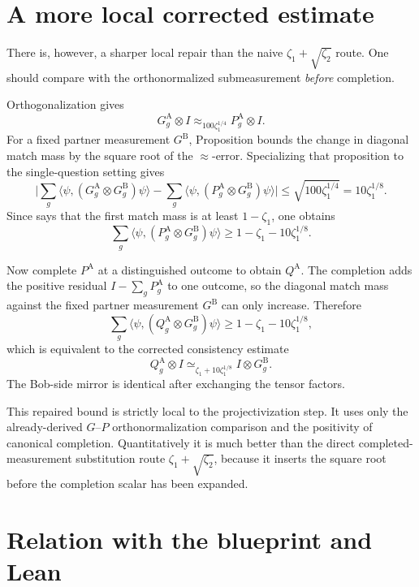 \documentclass[11pt]{article}
\begin{document}
\section{A more local corrected estimate}

There is, however, a sharper local repair than the naive
$\zeta_1 + \sqrt{\zeta_2}$ route.  One should compare with the
orthonormalized submeasurement \emph{before} completion.

Orthogonalization gives
\[
  G^{\mathrm A}_g \otimes I
  \approx_{100\zeta_1^{1/4}}
  P^{\mathrm A}_g \otimes I.
\]
For a fixed partner measurement $G^{\mathrm B}$, Proposition
 bounds the change in diagonal match
mass by the square root of the $\approx$-error.  Specializing that proposition
to the single-question setting gives
\[
  \bigl|
    \sum_g \langle \psi,
      (G^{\mathrm A}_g \otimes G^{\mathrm B}_g)\psi\rangle
    -
    \sum_g \langle \psi,
      (P^{\mathrm A}_g \otimes G^{\mathrm B}_g)\psi\rangle
  \bigr|
  \leq \sqrt{100\zeta_1^{1/4}}
  = 10\zeta_1^{1/8}.
\]
Since  says that the first match mass is at least
$1-\zeta_1$, one obtains
\[
  \sum_g \langle \psi,
    (P^{\mathrm A}_g \otimes G^{\mathrm B}_g)\psi\rangle
  \geq 1 - \zeta_1 - 10\zeta_1^{1/8}.
\]

Now complete $P^{\mathrm A}$ at a distinguished outcome to obtain
$Q^{\mathrm A}$.  The completion adds the positive residual
$I - \sum_g P^{\mathrm A}_g$ to one outcome, so the diagonal match mass against
the fixed partner measurement $G^{\mathrm B}$ can only increase.  Therefore
\[
  \sum_g \langle \psi,
    (Q^{\mathrm A}_g \otimes G^{\mathrm B}_g)\psi\rangle
  \geq 1 - \zeta_1 - 10\zeta_1^{1/8},
\]
which is equivalent to the corrected consistency estimate
\[
  Q^{\mathrm A}_g \otimes I
  \simeq_{\zeta_1 + 10\zeta_1^{1/8}}
  I \otimes G^{\mathrm B}_g.
\]
The Bob-side mirror is identical after exchanging the tensor factors.

This repaired bound is strictly local to the projectivization step.  It uses
only the already-derived $G$--$P$ orthonormalization comparison and the
positivity of canonical completion.  Quantitatively it is much better than the
direct completed-measurement substitution route
$\zeta_1 + \sqrt{\zeta_2}$, because it inserts the square root before the
completion scalar has been expanded.

\section{Relation with the blueprint and Lean}
\end{document}
